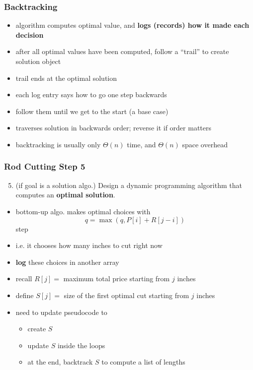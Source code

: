 \documentclass[10pt,aspectratio=169]{beamer}
\begin{document}
\begin{frame} \frametitle{Backtracking}
  \begin{itemize}
    \item algorithm computes optimal value, and \textbf{logs (records) how it made each decision}
    \item after all optimal values have been computed, follow a ``trail'' to create solution object
    \item trail ends at the optimal solution
    \item each log entry says how to go one step backwards
    \item follow them until we get to the start (a base case)
    \item traverses solution in backwards order; reverse it if order matters
    \item backtracking is usually only $\Theta(n)$ time, and $\Theta(n)$ space overhead
  \end{itemize}
\end{frame}

\begin{frame} \frametitle{Rod Cutting Step 5}
  \begin{enumerate}
    \setcounter{enumi}{4}
    \item (if goal is a solution algo.) Design a dynamic programming algorithm that computes an \textbf{optimal solution}.
  \end{enumerate}

  \begin{itemize}
    \item bottom-up algo. makes optimal choices with
      \[ q = \max(q, P[i] + R[j-i]) \]
      step
    \item i.e. it chooses how many inches to cut right now
    \item \textbf{log} these choices in another array
    \item recall $R[j] = $ maximum total price starting from $j$ inches
    \item define $S[j] = $ size of the first optimal cut starting from $j$ inches
    \item need to update pseudocode to
    \begin{itemize}
      \item create $S$
      \item update $S$ inside the loops
      \item at the end, backtrack $S$ to compute a list of lengths
    \end{itemize}
  \end{itemize}
\end{frame}
\end{document}

